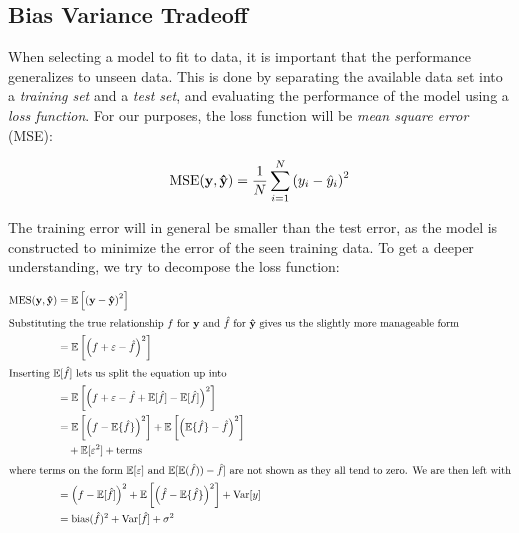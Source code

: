\subsection{Bias Variance Tradeoff}\label{sec:bias-vari-trad} 

When selecting a model to fit to data, it is important that the performance
generalizes to unseen data. This is done by separating the available data set
into a \textit{training set} and a \textit{test set}, and evaluating the
performance of the model using a \textit{loss function}. For our purposes, the
loss function will be \textit{mean square error} (MSE):

\begin{equation*}
  \text{MSE}(\vb{y}, \vb{\hat{y}}) = \frac{1}{N}\sum_{i=1}^{N}\left( y_{i} - \hat{y}_{i} \right)^{2}
\end{equation*}

The training error will in general be smaller than the test error, as the model
is constructed to minimize the error of the seen training data. To get a deeper
understanding, we try to decompose the loss function:

\begin{align*}
  \text{MES}(\vb{y}, \vb{\hat{y}}) &= \operatorname{\mathbb{E}}\left[ \left( \vb{y} - \vb{\hat{y}} \right)^{2} \right]\\
  \intertext{Substituting the true relationship \(f\) for \(\vb{y}\) and \(\hat f\) for \(\vb{\hat{y}}\)
  gives us the slightly more manageable form}
  &= \operatorname{\mathbb{E}}\left[ \left( f + \varepsilon - \hat f \right)^{2} \right]\\
    \intertext{Inserting \(\operatorname{\mathbb{E}}[\hat f]\) lets us split the equation up into}
  &= \operatorname{\mathbb{E}}\left[ \left( f + \varepsilon - \hat f + \operatorname{\mathbb{E}}[\hat f] - \operatorname{\mathbb{E}}[\hat f] \right)^{2} \right]\\
                                   &= \operatorname{\mathbb{E}}\left[\left( f - \operatorname{\mathbb{E}}\{\hat f\} \right)^{2}\right] + \operatorname{\mathbb{E}}\left[ \left( \operatorname{\mathbb{E}}\{\hat f\} - \hat f \right)^{2} \right]\\
  &\quad + \operatorname{\mathbb{E}}[\varepsilon^{2}] + \text{terms}\\
  \intertext{where terms on the form \(\operatorname{\mathbb{E}}[\varepsilon]\) and \(\operatorname{\mathbb{E}}[\operatorname{\mathbb{E}}(\hat f)) - \hat f]\) are not shown as they all tend to zero. We are then left with}
                                   &= \left( f - \operatorname{\mathbb{E}}[\hat f] \right)^{2} + \operatorname{\mathbb{E}}\left[\left(\hat f - \operatorname{\mathbb{E}}\{\hat f\}  \right)^{2}\right] + \text{Var}[y]\\
  &= \text{bias}(\hat f)^{2} + \text{Var}[\hat f]  + \sigma^{2}
\end{align*}

